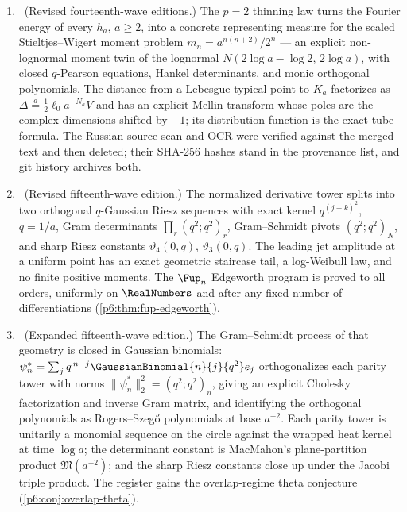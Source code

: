 \documentclass[11pt,oneside]{article}
\numberwithin{equation}{section}
\theoremstyle{definition}
\theoremstyle{remark}
\begin{document}
\begin{enumerate}
\item \newflag\ (Revised fourteenth-wave editions.)  The $p=2$ thinning law
turns the Fourier energy of every $h_a$, $a\ge2$, into a concrete
representing measure for the scaled Stieltjes--Wigert moment problem
$m_n=a^{n(n+2)}/2^n$ --- an explicit non-lognormal moment twin of the
lognormal $N(2\log a-\log2,\,2\log a)$, with closed $q$-Pearson equations,
Hankel determinants, and monic orthogonal polynomials.  The distance from a
Lebesgue-typical point to $K_a$ factorizes as
$\Delta\overset d=\tfrac12\ell_0a^{-N_a}V$ and has an explicit Mellin
transform whose poles are the complex dimensions shifted by $-1$; its
distribution function is the exact tube formula.  The Russian source scan
and OCR were verified against the merged text and then deleted; their
SHA-256 hashes stand in the provenance list, and git history archives both.

\item \newflag\ (Revised fifteenth-wave edition.)  The normalized derivative
tower splits into two orthogonal $q$-Gaussian Riesz sequences with exact
kernel $q^{(j-k)^2}$, $q=1/a$, Gram determinants
$\prod_r(q^2;q^2)_r$, Gram--Schmidt pivots $(q^2;q^2)_N$, and sharp Riesz
constants $\vartheta_4(0,q)$, $\vartheta_3(0,q)$.  The leading jet amplitude
at a uniform point has an exact geometric staircase tail, a log-Weibull law,
and no finite positive moments.  The $\Fup_n$ Edgeworth program is proved to
all orders, uniformly on $\RealNumbers$ and after any fixed number of
differentiations (\cref{p6:thm:fup-edgeworth}).

\item \newflag\ (Expanded fifteenth-wave edition.)  The Gram--Schmidt
process of that geometry is closed in Gaussian binomials:
$\psi_n^{\ast}=\sum_jq^{\,n-j}\GaussianBinomial{n}{j}{q^2}e_j$ orthogonalizes each
parity tower with norms $\|\psi_n^{\ast}\|_2^2=(q^2;q^2)_n$, giving an
explicit Cholesky factorization and inverse Gram matrix, and identifying
the orthogonal polynomials as Rogers--Szeg\H{o} polynomials at base
$a^{-2}$.  Each parity tower is unitarily a monomial sequence on the circle
against the wrapped heat kernel at time $\log a$; the determinant constant
is MacMahon's plane-partition product $\mathfrak M(a^{-2})$; and the sharp
Riesz constants close up under the Jacobi triple product.  The register
gains the overlap-regime theta conjecture
(\cref{p6:conj:overlap-theta}).


\end{enumerate}
\end{document}
